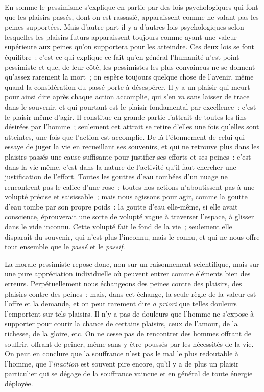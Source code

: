 \documentclass[french,twoside]{book} %
\begin{document}
En somme le pessimisme s’explique en partie par des lois psychologiques qui font que les plaisirs passés, dont on est rassasié, apparaissent comme ne valant pas les peines supportées. Mais d’autre part il y a d’autres lois psychologiques selon lesquelles les plaisirs futurs apparaissent toujours comme ayant une valeur supérieure aux peines qu’on supportera pour les atteindre. Ces deux lois se font équilibre : c’est ce qui explique ce fait qu’en général l’humanité n’est point pessimiste et que, de leur côté, les pessimistes les plus convaincus ne se donnent qu’assez rarement la mort ; on espère toujours quelque chose de l’avenir, même quand la considération du passé porte à désespérer. Il y a un plaisir qui meurt pour ainsi dire après chaque action accomplie, qui s’en va sans laisser de trace dans le souvenir, et qui pourtant est le plaisir fondamental par excellence : c’est le plaisir même d’agir. Il constitue en grande partie l’attrait de toutes les fins désirées par l’homme ; seulement cet attrait se retire d’elles une fois qu’elles sont atteintes, une fois que l’action est accomplie. De là l’étonnement de celui qui essaye de juger la vie en recueillant ses souvenirs, et qui ne retrouve plus dans les plaisirs passés une cause suffisante pour justifier ses efforts et ses peines : c’est dans la vie même, c’est dans la nature de l’activité qu’il faut chercher une justification de l’effort. Toutes les gouttes d’eau tombées d’un nuage ne rencontrent pas le calice d’une rose ; toutes nos actions n’aboutissent pas à une volupté précise et saisissable ; mais nous agissons pour agir, comme la goutte d’eau tombe par son propre poids : la goutte d’eau elle-même, si elle avait conscience, éprouverait une sorte de volupté vague à traverser l’espace, à glisser dans le vide inconnu. Cette volupté fait le fond de la vie ; seulement elle disparaît du souvenir, qui n’est plus l’inconnu, mais le connu, et qui ne nous offre tout ensemble que le \emph{passé} et le \emph{passif}.\par
La morale pessimiste repose donc, non sur un raisonnement scientifique, mais sur une pure appréciation individuelle où peuvent entrer comme éléments bien des erreurs. Perpétuellement nous échangeons des peines contre des plaisirs, des plaisirs contre des peines ; mais, dans cet échange, la seule règle de la valeur est l’offre et la demande, et on peut rarement dire \emph{a priori} que telles douleurs l’emportent sur tels plaisirs. Il n’y a pas de douleurs que l’homme ne s’expose à supporter pour courir la chance de certains plaisirs, ceux de l’amour, de la richesse, de la gloire, etc. On ne cesse pas de rencontrer des hommes offrant de souffrir, offrant de peiner, même sans y être poussés par les nécessités de la vie. On peut en conclure que la souffrance n’est pas le mal le plus redoutable à l’homme, que l’\emph{inaction} est souvent pire encore, qu’il y a de plus un plaisir particulier qui se dégage de la souffrance vaincue et en général de toute énergie déployée.\par
\end{document}
